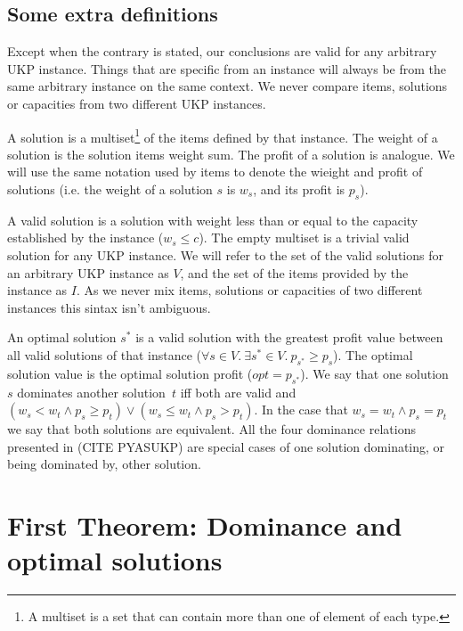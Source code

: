 \documentclass[12pt]{article}
\begin{document}
\subsection{Some extra definitions}

Except when the contrary is stated, our conclusions are valid for any arbitrary UKP instance. Things that are specific from an instance will always be from the same arbitrary instance on the same context. We never compare items, solutions or capacities from two different UKP instances.

A solution is a multiset\footnote{A multiset is a set that can contain more than one of element of each type.} of the items defined by that instance. The weight of a solution is the solution items weight sum. The profit of a solution is analogue.  We will use the same notation used by items to denote the wieight and profit of solutions (i.e. the weight of a solution \(s\) is \(w_s\), and its profit is \(p_s\)).

A valid solution is a solution with weight less than or equal to the capacity established by the instance (\(w_s \leq c\)). The empty multiset is a trivial valid solution for any UKP instance. We will refer to the set of the valid solutions for an arbitrary UKP instance as \(V\), and the set of the items provided by the instance as \(I\). As we never mix items, solutions or capacities of two different instances this sintax isn't ambiguous.

An optimal solution \(s^*\) is a valid solution with the greatest profit value between all valid solutions of that instance (\(\forall s \in V.~\exists s^* \in V.~p_{s^*} \geq p_s\)). The optimal solution value is the optimal solution profit (\(opt = p_{s^*}\)). We say that one solution~\(s\) dominates another solution~\(t\) iff both are valid and \((w_s <  w_t \land p_s \geq p_t) \lor (w_s \leq w_t \land p_s > p_t)\). In the case that \(w_s = w_t \land p_s = p_t\) we say that both solutions are equivalent. All the four dominance relations presented in (CITE PYASUKP) are special cases of one solution dominating, or being dominated by, other solution.

\section{First Theorem: Dominance and optimal solutions}
\end{document}
